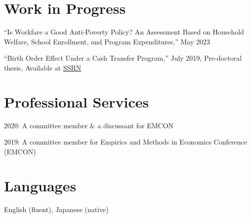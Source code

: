 \documentclass[margin,line]{res}
\newenvironment{list1}{
  \begin{list}{\ding{113}}{%
      \setlength{\itemsep}{.025in}
      \setlength{\parsep}{0in} \setlength{\parskip}{0in}
      \setlength{\topsep}{0in} \setlength{\partopsep}{0in}
      \setlength{\leftmargin}{0.17in}}}{\end{list}}
\begin{document}
\begin{resume}
\section{Work in Progress}
\begin{list1}
\item[] ``Is Workfare a Good Anti-Poverty Policy? An Assessment Based on Household Welfare, School Enrollment, and Program Expenditures,'' May 2023
\item[] ``Birth Order Effect Under a Cash Transfer Program,'' July 2019, Pre-doctoral thesis, Available at \href{https://papers.ssrn.com/sol3/papers.cfm?abstract_id=3010113}{SSRN}
\end{list1}

\section{Professional Services}
\begin{list1}
\item[] 2020: A committee member \& a discussant for EMCON
\item[] 2019: A committee member for Empirics and Methods in Economics Conference (EMCON)
\end{list1}

\section{Languages}
\begin{list1}
\item[] English (fluent), Japanese (native)
\end{list1}


\end{resume}
\end{document}
